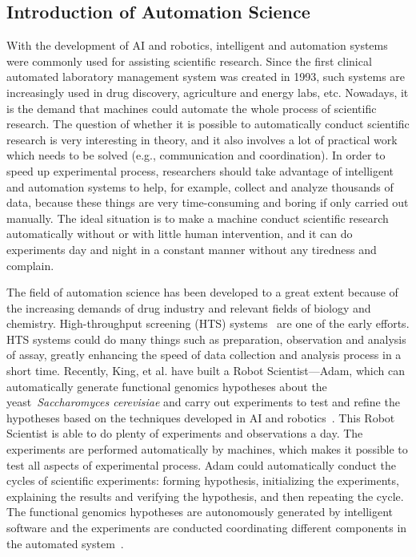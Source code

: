 \subsection{Introduction of Automation Science}

With the development of AI and robotics, intelligent and automation systems were commonly used for assisting scientific research. Since the first clinical automated laboratory management system \cite{Steinlechner2001} was created in 1993, such systems are increasingly used in drug discovery, agriculture and energy labs, etc. Nowadays, it is the demand that machines could automate the whole process of scientific research. The question of whether it is possible to automatically conduct scientific research is very interesting in theory, and it also involves a lot of practical work which needs to be solved (e.g., communication and coordination). In order to speed up experimental process, researchers should take advantage of intelligent and automation systems to help, for example, collect and analyze thousands of data, because these things are very time-consuming and boring if only carried out manually. The ideal situation is to make a machine conduct scientific research automatically without or with little human intervention, and it can do experiments day and night in a constant manner without any tiredness and complain.
          
The field of automation science has been developed to a great extent because of the increasing demands of drug industry and relevant fields of biology and chemistry. High-throughput screening (HTS) systems~\cite{Persidis_1998} are one of the early efforts. HTS systems could do many things such as preparation, observation and analysis of assay, greatly enhancing the speed of data collection and analysis process in a short time. Recently, King, et al. have built a Robot Scientist---Adam,  which can automatically generate functional genomics hypotheses about the yeast~\textit{Saccharomyces cerevisiae} and carry out experiments to test and refine the hypotheses based on the techniques developed in AI and robotics~\cite{King_2004, King_2009}. This Robot Scientist is able to do plenty of experiments and observations a day. The experiments are performed automatically by machines, which makes it possible to test all aspects of experimental process. Adam could automatically conduct the cycles of scientific experiments: forming hypothesis, initializing the experiments, explaining the results and verifying the hypothesis, and then repeating the cycle. The functional genomics hypotheses are autonomously generated by intelligent software and the experiments are conducted coordinating different components in the automated system~\cite{King_2004}. %

